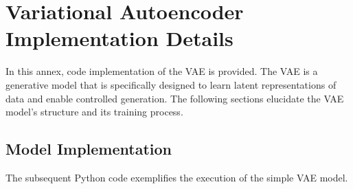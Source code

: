 \chapter{Variational Autoencoder Implementation Details} \label{ann:VAE}

In this annex, code implementation of the \ac{VAE} is provided. The \ac{VAE} is a generative model that is specifically designed to learn latent representations of data and enable controlled generation. The following sections elucidate the \ac{VAE} model's structure and its training process.

\section{Model Implementation}

The subsequent Python code exemplifies the execution of the simple \ac{VAE} model.

